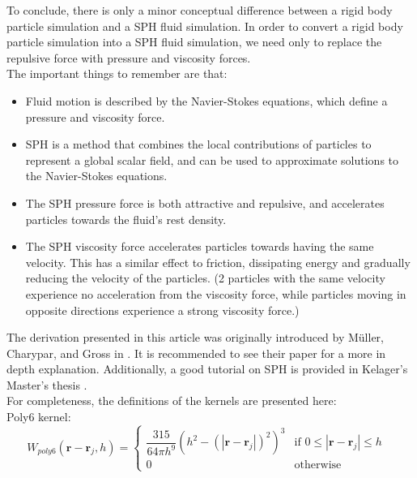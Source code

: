 \documentclass[]{article}
\begin{document}
	To conclude, there is only a minor conceptual difference between a rigid body particle simulation and a SPH fluid 
	simulation. In order to convert a rigid body particle simulation into a SPH fluid simulation, we need only to 
	replace the repulsive force with pressure and viscosity forces.\\
	
	The important things to remember are that: 
	\begin{itemize}
		\item Fluid motion is described by the Navier-Stokes equations, which define a pressure and viscosity force.
		\item SPH is a method that combines the local contributions of particles to represent a global scalar field, 
		and can be used to approximate solutions to the Navier-Stokes equations.
		\item The SPH pressure force is both attractive and repulsive, and accelerates particles towards the fluid's 
		rest density.
		\item The SPH viscosity force accelerates particles towards having the same velocity. This has a similar effect
		to friction, dissipating energy and gradually reducing the velocity of the particles. (2 particles with the 
		same velocity experience no acceleration from the viscosity force, while particles moving in opposite directions 
		experience a strong viscosity force.)
	\end{itemize}
	
	The derivation presented in this article was originally introduced by M\"{u}ller, Charypar, and Gross in 
	\cite{Muller:2003:PFS:846276.846298}. It is recommended to see their paper for a more in depth explanation. 
	Additionally, a good tutorial on SPH is provided in Kelager's Master's thesis \cite{MK:2006}.\\
	
	For completeness, the definitions of the kernels are presented here:\\
	
	Poly6 kernel:
	\begin{equation}
		W_{poly6}(\mathbf{r} - \mathbf{r}_j, h) = 
			\left \{ 
				\begin{array}{ll}
					\dfrac{315}{64 \pi h^9 } (h^2 - (|\mathbf{r} - \mathbf{r}_j|)^2)^3 
						& \textrm{if \(0 \leq |\mathbf{r} - \mathbf{r}_j| \leq h\) } \\[1em]
					0 & \textrm{otherwise} 
				\end{array}
			\right.
	\end{equation}
	
\end{document}

